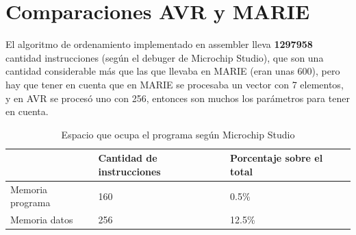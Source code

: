 \documentclass[letterpaper, 10 pt, conference]{ieeeconf}  %
\begin{document}
\section{Comparaciones AVR y MARIE}
El algoritmo de ordenamiento implementado en assembler lleva \textbf{1297958} cantidad instrucciones (según el debuger de Microchip Studio), que son una cantidad considerable más que las que llevaba en MARIE (eran unas 600), pero hay que tener en cuenta que en MARIE se procesaba un vector con 7 elementos, y en AVR se procesó uno con 256, entonces son muchos los parámetros para tener en cuenta.

\begin{table}[H]
  \centering
  \begin{tabular}{|l|l|l|}
    \hline
                      & Cantidad de instrucciones   & Porcentaje sobre el total   \\ \hline
    Memoria programa  & 160                         & 0.5\%                       \\ \hline
    Memoria datos     & 256                         & 12.5\%                      \\ \hline
  \end{tabular}
  \caption{Espacio que ocupa el programa según Microchip Studio}
  \label{tab:memorio_resultado}
\end{table}
\end{document}
